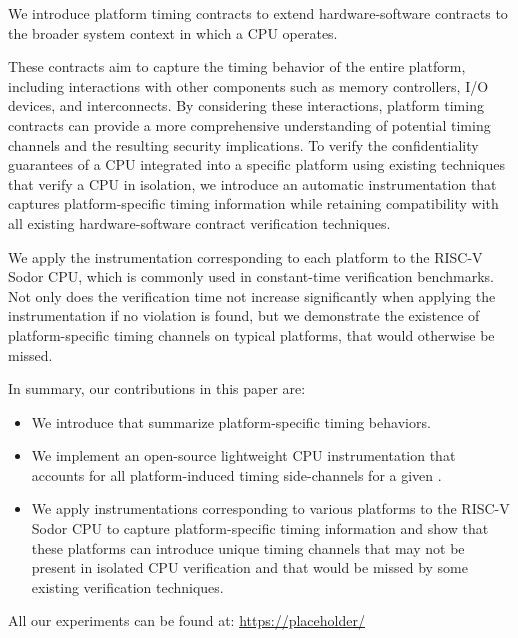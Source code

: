 We introduce platform timing contracts to extend hardware-software contracts to the broader system context in which a CPU operates.

These contracts aim to capture the timing behavior of the entire platform, including interactions with other components such as memory controllers, I/O devices, and interconnects.
By considering these interactions, platform timing contracts can provide a more comprehensive understanding of potential timing channels and the resulting security implications.
To verify the confidentiality guarantees of a CPU integrated into a specific platform using existing techniques that verify a CPU in isolation, we introduce an automatic instrumentation that captures platform-specific timing information while retaining compatibility with all existing hardware-software contract verification techniques.

We apply the instrumentation corresponding to each platform to the RISC-V Sodor CPU, which is commonly used in constant-time verification benchmarks.
Not only does the verification time not increase significantly when applying the instrumentation if no violation is found, but we demonstrate the existence of platform-specific timing channels on typical platforms, that would otherwise be missed.

In summary, our contributions in this paper are:
\begin{itemize}
    \item We introduce \pics that summarize platform-specific timing behaviors.
    
    \vspace{0.5em}
    \item We implement an open-source lightweight CPU instrumentation that accounts for all platform-induced timing side-channels for a given \pic.
    
    \vspace{0.5em}
    \item We apply instrumentations corresponding to various platforms to the RISC-V Sodor CPU to capture platform-specific timing information and show that these platforms can introduce unique timing channels that may not be present in isolated CPU verification and that would be missed by some existing verification techniques.
\end{itemize}

All our experiments can be found at: \url{https://placeholder/} 
